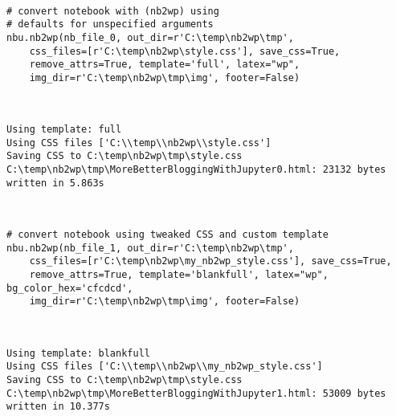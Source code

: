 ~~~~

\begin{verbatim}
# convert notebook with (nb2wp) using
# defaults for unspecified arguments
nbu.nb2wp(nb_file_0, out_dir=r'C:\temp\nb2wp\tmp',
    css_files=[r'C:\temp\nb2wp\style.css'], save_css=True, 
    remove_attrs=True, template='full', latex="wp",
    img_dir=r'C:\temp\nb2wp\tmp\img', footer=False)
\end{verbatim}

~~~~

\begin{verbatim}
Using template: full
Using CSS files ['C:\\temp\\nb2wp\\style.css']
Saving CSS to C:\temp\nb2wp\tmp\style.css
C:\temp\nb2wp\tmp\MoreBetterBloggingWithJupyter0.html: 23132 bytes written in 5.863s
\end{verbatim}

~~~~

\begin{verbatim}
# convert notebook using tweaked CSS and custom template
nbu.nb2wp(nb_file_1, out_dir=r'C:\temp\nb2wp\tmp',
    css_files=[r'C:\temp\nb2wp\my_nb2wp_style.css'], save_css=True, 
    remove_attrs=True, template='blankfull', latex="wp", bg_color_hex='cfcdcd',
    img_dir=r'C:\temp\nb2wp\tmp\img', footer=False)
\end{verbatim}

~~~~

\begin{verbatim}
Using template: blankfull
Using CSS files ['C:\\temp\\nb2wp\\my_nb2wp_style.css']
Saving CSS to C:\temp\nb2wp\tmp\style.css
C:\temp\nb2wp\tmp\MoreBetterBloggingWithJupyter1.html: 53009 bytes written in 10.377s
\end{verbatim}




 
 
 
